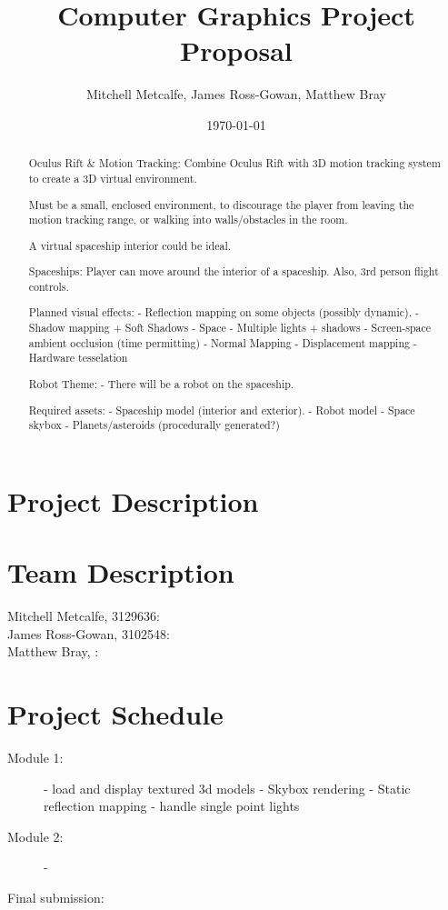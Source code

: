 \documentclass[11pt]{scrartcl} %
\title{Computer Graphics Project Proposal}
\author{Mitchell Metcalfe, James Ross-Gowan, Matthew Bray }
\date{\today} %
\begin{document}
\maketitle

\begin{abstract}

Oculus Rift & Motion Tracking:
    Combine Oculus Rift with 3D motion tracking system to create a 3D virtual
    environment.

    Must be a small, enclosed environment, to discourage the player from
    leaving the motion tracking range, or walking into walls/obstacles in the
    room.

    A virtual spaceship interior could be ideal.

Spaceships: 
    Player can move around the interior of a spaceship.
    Also, 3rd person flight controls.

    Planned visual effects:
        - Reflection mapping on some objects (possibly dynamic).
        - Shadow mapping + Soft Shadows
        - Space
        - Multiple lights + shadows
        - Screen-space ambient occlusion (time permitting)
        - Normal Mapping
        - Displacement mapping
        - Hardware tesselation

    Robot Theme:
        - There will be a robot on the spaceship.

    Required assets:
        - Spaceship model (interior and exterior).
        - Robot model
        - Space skybox
        - Planets/asteroids (procedurally generated?)

\end{abstract}

\section*{Project Description}


\section*{Team Description}
    \begin{description}
        \item[Mitchell Metcalfe, 3129636:]

        \item[James Ross-Gowan, 3102548:]

        \item[Matthew Bray, :]

    \end{description}
    
\section*{Project Schedule}

\begin{description}
    \item[Module 1:]
        - load and display textured 3d models
        - Skybox rendering
        - Static reflection mapping
        - handle single point lights
    \item[Module 2:]
        - 
    \item[Final submission:]
\end{description}
\end{document}
